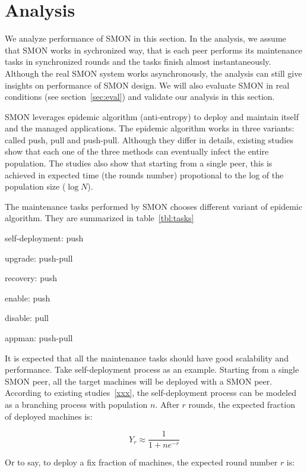 \section{Analysis}
\label{sec:analysis}

We analyze performance of SMON in this section. In the analysis,
we assume that SMON works in sychronized way, that is each peer
performs its maintenance tasks in synchronized rounds and the
tasks finish almost instantaneously. Although the real SMON
system works asynchronously, the analysis can still give
insights on performance of SMON design. We will also evaluate
SMON in real conditions (see section~\ref{sec:eval}) and
validate our analysis in this section.


SMON leverages epidemic algorithm (anti-entropy) to deploy
and maintain itself and the managed applications. The
epidemic algorithm works in three variants: called push, pull
and push-pull. Although they differ in details, existing
studies~\cite{xxx} show that each one of the three methods
can eventually infect the entire population. The studies
also show that starting from a single peer, this is achieved
in expected time (the rounds number) propotional to the log
of the population size ($\log N$).

The maintenance tasks performed by SMON chooses
different variant of epidemic algorithm. They are summarized
in table~\ref{tbl:tasks}

self-deployment: push

upgrade: push-pull

recovery: push

enable: push

disable: pull

appman: push-pull

It is expected that all the maintenance tasks should have
good scalability and performance. Take self-deployment
process as an example. Starting from a single SMON peer, all
the target machines will be deployed with a SMON peer.
According to existing studies~\ref{xxx}, the self-deployment
process can be modeled as a branching process with
population $n$. After $r$ rounds, the expected fraction of
deployed machines is:

\begin{equation*}
Y_r \approx \frac{1}{1+ne^{-r}} 
\end{equation*}

Or to say, to deploy a fix fraction of machines, the
expected round number $r$ is:


